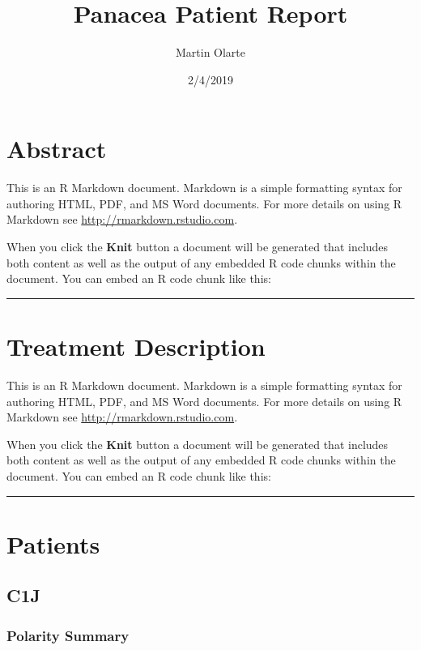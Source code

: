 \documentclass[]{article}
\title{Panacea Patient Report}
\author{Martin Olarte}
\date{2/4/2019}
\begin{document}
\maketitle

{
\setcounter{tocdepth}{3}
\tableofcontents
}
\section{Abstract}\label{abstract}

This is an R Markdown document. Markdown is a simple formatting syntax
for authoring HTML, PDF, and MS Word documents. For more details on
using R Markdown see \url{http://rmarkdown.rstudio.com}.

When you click the \textbf{Knit} button a document will be generated
that includes both content as well as the output of any embedded R code
chunks within the document. You can embed an R code chunk like this:

\begin{center}\rule{0.5\linewidth}{\linethickness}\end{center}

\section{Treatment Description}\label{treatment-description}

This is an R Markdown document. Markdown is a simple formatting syntax
for authoring HTML, PDF, and MS Word documents. For more details on
using R Markdown see \url{http://rmarkdown.rstudio.com}.

When you click the \textbf{Knit} button a document will be generated
that includes both content as well as the output of any embedded R code
chunks within the document. You can embed an R code chunk like this:

\begin{center}\rule{0.5\linewidth}{\linethickness}\end{center}

\section{Patients}\label{patients}

\subsection{C1J}\label{c1j}

\subsubsection{Polarity Summary}\label{polarity-summary}
\end{document}
